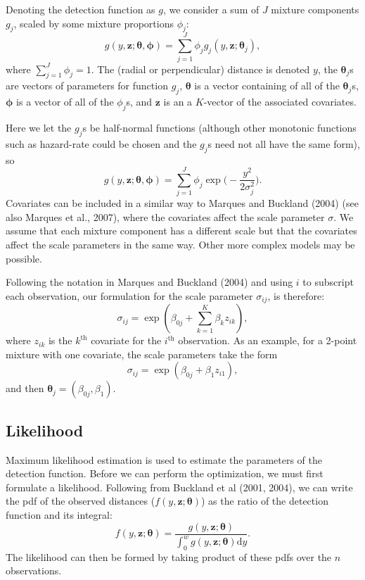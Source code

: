 \documentclass[useAMS,referee]{biom}
\begin{document}
Denoting the detection function as $g$, we consider a sum of $J$ mixture components $g_j$, scaled by some mixture proportions $\phi_j$:
\begin{equation*}
g(y,\mathbf{z}; \bm{\theta}, \bm{\phi}) = \sum_{j=1}^J \phi_j g_j(y,\mathbf{z}; \bm{\theta}_j),
\end{equation*}
where $\sum_{j=1}^J \phi_j = 1$. The (radial or perpendicular) distance is denoted $y$, the $\bm{\theta}_j$s are vectors of parameters for function $g_j$, $\bm{\theta}$ is a vector containing of all of the $\bm{\theta}_j$s, $\bm{\phi}$ is a vector of all of the $\phi_j$s, and $\mathbf{z}$ is an a $K$-vector of the associated covariates.  

Here we let the $g_j$s be half-normal functions (although other monotonic functions such as hazard-rate could be chosen and the $g_j$s need not all have the same form), so
\begin{equation*}
g(y,\mathbf{z}; \bm{\theta}, \bm{\phi}) = \sum_{j=1}^J \phi_j \exp \Big( - \frac{y^2}{2\sigma_j^2} \Big).
\end{equation*}
Covariates can be included in a similar way to Marques and Buckland (2004) (see also Marques et al., 2007), where the covariates affect the scale parameter $\sigma$. We assume that each mixture component has a different scale but that the covariates affect the scale parameters in the same way. Other more complex models may be possible.

Following the notation in Marques and Buckland (2004) and using $i$ to subscript each observation, our formulation for the scale parameter $\sigma_{ij}$, is therefore:
\begin{equation*}
\sigma_{ij} = \exp( \beta_{0j} + \sum_{k=1}^K \beta_k z_{ik}),
\end{equation*}
where $z_{ik}$ is the $k^\text{th}$ covariate for the $i^\text{th}$ observation. As an example, for a 2-point mixture with one covariate, the scale parameters take the form
\begin{equation*}
\sigma_{ij} = \exp( \beta_{0j} + \beta_1 z_{i1}),
\end{equation*}
and then $\bm{\theta}_j = (\beta_{0j}, \beta_1)$. 


\subsection{Likelihood}
\label{s:likelihood}

Maximum likelihood estimation is used to estimate the parameters of the detection function. Before we can perform the optimization, we must first formulate a likelihood. Following from Buckland et al (2001, 2004), we can write the pdf of the observed distances ($f(y,\bm{z}; \bm{\theta}) $) as the ratio of the detection function and its integral:
\begin{equation*}
f(y,\bm{z}; \bm{\theta}) = \frac{g(y,\bm{z}; \bm{\theta})}{\int_0^w g(y,\bm{z}; \bm{\theta}) \text{d}y}.
\end{equation*}
The likelihood can then be formed by taking product of these pdfs over the $n$ observations.
\end{document}
